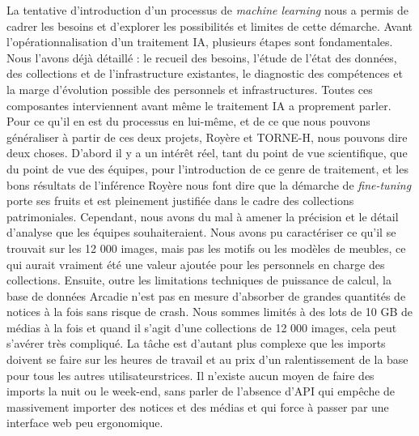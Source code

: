 La tentative d'introduction d'un processus de \textit{machine learning} nous a permis de cadrer les besoins et d'explorer les possibilités et limites de cette démarche. Avant l'opérationnalisation d'un traitement IA, plusieurs étapes sont fondamentales. Nous l'avons déjà détaillé : le recueil des besoins, l'étude de l'état des données, des collections et de l'infrastructure existantes, le diagnostic des compétences et la marge d'évolution possible des personnels et infrastructures. Toutes ces composantes interviennent avant même le traitement IA a proprement parler. Pour ce qu'il en est du processus en lui-même, et de ce que nous pouvons généraliser à partir de ces deux projets, Royère et TORNE-H, nous pouvons dire deux choses. D'abord il y a un intérêt réel, tant du point de vue scientifique, que du point de vue des équipes, pour l'introduction de ce genre de traitement, et les bons résultats de l'inférence Royère nous font dire que la démarche de \textit{fine-tuning} porte ses fruits et est pleinement justifiée dans le cadre des collections patrimoniales. Cependant, nous avons du mal à amener la précision et le détail d'analyse que les équipes souhaiteraient. Nous avons pu caractériser ce qu'il se trouvait sur les 12 000 images, mais pas les motifs ou les modèles de meubles, ce qui aurait vraiment été une valeur ajoutée pour les personnels en charge des collections. Ensuite, outre les limitations techniques de puissance de calcul, la base de données Arcadie n'est pas en mesure d'absorber de grandes quantités de notices à la fois sans risque de crash. Nous sommes limités à des lots de 10 GB de médias à la fois et quand il s'agit d'une collections de 12 000 images, cela peut s'avérer très compliqué. La tâche est d'autant plus complexe que les imports doivent se faire sur les heures de travail et au prix d'un ralentissement de la base pour tous les autres utilisateurs\wokisme trices. Il n'existe aucun moyen de faire des imports la nuit ou le week-end, sans parler de l'absence d'API qui empêche de massivement importer des notices et des médias et qui force à passer par une interface web peu ergonomique. 

